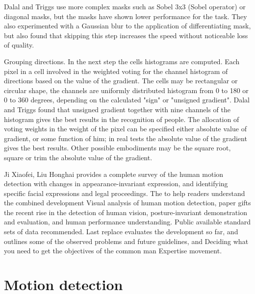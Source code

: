 Dalal and Triggs use more complex masks such as Sobel 3x3 (Sobel operator) or diagonal masks, but the masks have shown lower performance for the task. They also experimented with a Gaussian blur to the application of differentiating mask, but also found that skipping this step increases the speed without noticeable loss of quality.

Grouping directions. In the next step the cells histograms are computed. Each pixel in a cell involved in the weighted voting for the channel histogram of directions based on the value of the gradient. The cells may be rectangular or circular shape, the channels are uniformly distributed histogram from 0 to 180 or 0 to 360 degrees, depending on the calculated "sign" or "unsigned gradient". Dalal and Triggs found that unsigned gradient together with nine channels of the histogram gives the best results in the recognition of people. The allocation of voting weights in the weight of the pixel can be specified either absolute value of gradient, or some function of him; in real tests the absolute value of the gradient gives the best results. Other possible embodiments may be the square root, square or trim the absolute value of the gradient. \cite{Dalal}

Ji Xiaofei, Liu Honghai \cite{Yu} provides a complete survey of the human motion detection with changes in appearance-invariant expression, and identifying specific facial expressions and legal proceedings. The to help readers understand the combined development Visual analysis of human motion detection, paper gifts the recent rise in the detection of human vision, posture-invariant demonstration and evaluation, and human performance understanding. Public available standard sets of data recommended. Last replace evaluates the development so far, and outlines some of the observed problems and future guidelines, and Deciding what you need to get the objectives of the common man Expertise movement.

\section{Motion detection}

